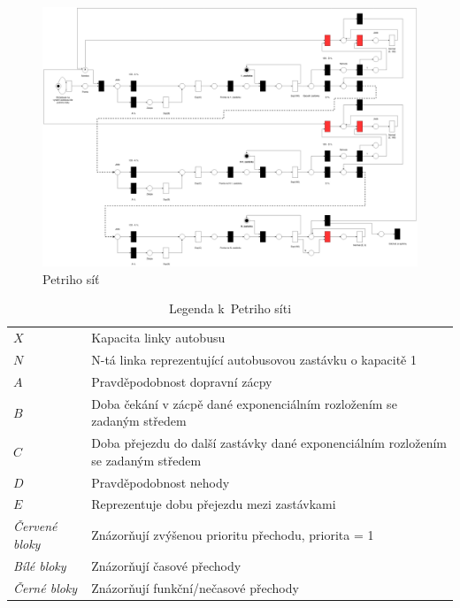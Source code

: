 \documentclass[a4paper]{article}
\begin{document}
            \begin{figure}[H]
                \includegraphics[scale=0.18, keepaspectratio]{fig/petri_doprava.png}
                \caption{Petriho síť}
                \label{fig:petri_nest}
            \end{figure}

            \begin{table}[H]
                \centering
                \begin{tabular}{ l l }
                    $X$ & Kapacita linky autobusu \\
                    $N$ & N-tá linka reprezentující autobusovou zastávku o kapacitě 1 \\
                    $A$ & Pravděpodobnost dopravní zácpy \\
                    $B$ & Doba čekání v zácpě dané exponenciálním rozložením se zadaným středem \\
                    $C$ & Doba přejezdu do další zastávky dané exponenciálním rozložením se zadaným středem \\
                    $D$ & Pravděpodobnost nehody \\
                    $E$ & Reprezentuje dobu přejezdu mezi zastávkami \\
                    \textit{Červené bloky} & Znázorňují zvýšenou prioritu přechodu, priorita = 1\\
                    \textit{Bílé bloky} & Znázorňují časové přechody\\
                    \textit{Černé bloky} & Znázorňují funkční/nečasové přechody\\
                \end{tabular}
                \caption{Legenda k~Petriho síti}
                \label{tab:petri}
            \end{table}
\end{document}
